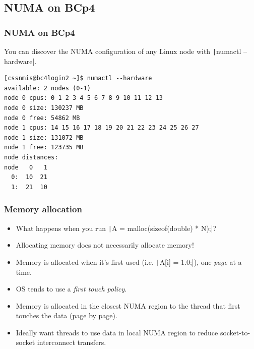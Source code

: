 \documentclass[aspectratio=169]{beamer}
\begin{document}
\subsection{NUMA on BCp4}
\begin{frame}[fragile]
\frametitle{NUMA on BCp4}
You can discover the NUMA configuration of any Linux node with \texttt|numactl --hardware|.


\begin{verbatim}
[cssnmis@bc4login2 ~]$ numactl --hardware
available: 2 nodes (0-1)
node 0 cpus: 0 1 2 3 4 5 6 7 8 9 10 11 12 13
node 0 size: 130237 MB
node 0 free: 54862 MB
node 1 cpus: 14 15 16 17 18 19 20 21 22 23 24 25 26 27
node 1 size: 131072 MB
node 1 free: 123735 MB
node distances:
node   0   1 
  0:  10  21 
  1:  21  10 
\end{verbatim}

\end{frame}



\begin{frame}
\frametitle{Memory allocation}
\begin{itemize}
  \item What happens when you run \texttt|A = malloc(sizeof(double) * N);|?
  \pause
  \item Allocating memory does not necessarily allocate memory!
  \item Memory is allocated when it's first used (i.e. \texttt|A[i] = 1.0;|), one \emph{page} at a time.
  \item OS tends to use a \emph{first touch policy}.
  \item Memory is allocated in the closest NUMA region to the thread that first touches the data (page by page).
  \item Ideally want threads to use data in local NUMA region to reduce socket-to-socket interconnect transfers.
\end{itemize}
\end{frame}

\end{document}

